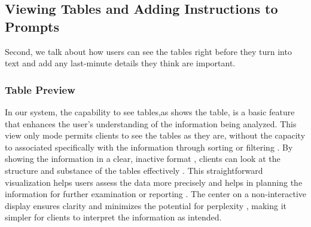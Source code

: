 \subsection{Viewing Tables and Adding Instructions to Prompts}
Second, we talk about how users can see the tables right before they turn into text and add any last-minute details they think are important.

\subsubsection{Table Preview}
In our system, the capability to see tables,as shows the table, is a basic feature that enhances the user's understanding of the information being analyzed. This view only mode permits clients to see the tables as they are, without the capacity to associated specifically with the information through sorting or filtering . By showing the information in a clear, inactive format , clients can look at the structure and substance of the tables effectively . This straightforward visualization helps users assess the data more precisely and helps in planning the information for further examination or reporting . The center on a non-interactive display ensures clarity and minimizes the potential for perplexity , making it simpler for clients to interpret the information as intended.


